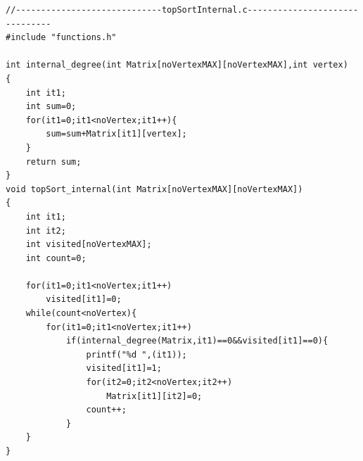 \documentclass[14pt]{article}
\begin{document}
\begin{lstlisting}
//-----------------------------topSortInternal.c-------------------------------
#include "functions.h"

int internal_degree(int Matrix[noVertexMAX][noVertexMAX],int vertex)
{
    int it1;
    int sum=0;
    for(it1=0;it1<noVertex;it1++){
        sum=sum+Matrix[it1][vertex];
    }
    return sum;
}
void topSort_internal(int Matrix[noVertexMAX][noVertexMAX])
{
    int it1;
    int it2;
    int visited[noVertexMAX];
    int count=0;

    for(it1=0;it1<noVertex;it1++)
        visited[it1]=0;
    while(count<noVertex){
        for(it1=0;it1<noVertex;it1++)
            if(internal_degree(Matrix,it1)==0&&visited[it1]==0){
                printf("%d ",(it1));
                visited[it1]=1;
                for(it2=0;it2<noVertex;it2++)
                    Matrix[it1][it2]=0;
                count++;
            }
    }
}
\end{lstlisting}
\end{document}
